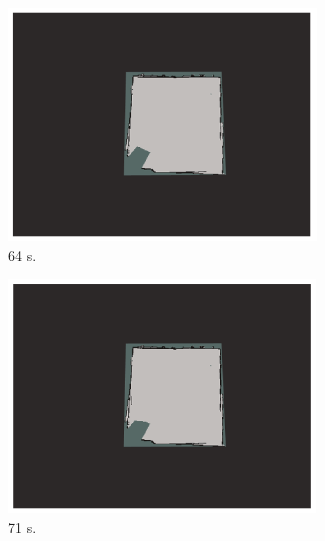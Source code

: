 \documentclass[11pt,openany]{book}
\begin{document}
\begin{figure}[H]
\begin{subfigure}[H]{0.3\linewidth}
        \includegraphics[width=\linewidth]{assets/4_12_g.png}
        \caption{{64 s.}}
        \label{fig:4.12g}
    \end{subfigure}
    \begin{subfigure}[H]{0.3\linewidth}
        \includegraphics[width=\linewidth]{assets/4_12_h.png}
        \caption{{71 s.}}
        \label{fig:4.12h}
    \end{subfigure}
    \begin{subfigure}[H]{0.3\linewidth}

\end{subfigure}
\end{figure}
\end{document}
